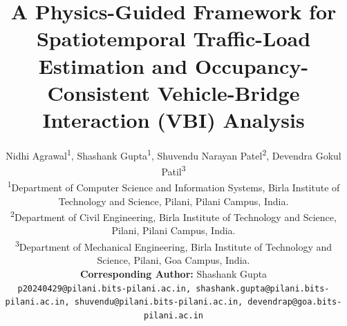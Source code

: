 \documentclass[journal]{IEEEtran}
\begin{document}
    \title{A Physics-Guided Framework for Spatiotemporal Traffic-Load Estimation and Occupancy-Consistent Vehicle-Bridge Interaction (VBI) Analysis}
\author{\footnotesize
    Nidhi Agrawal\textsuperscript{1},
    Shashank Gupta\textsuperscript{1},
    Shuvendu Narayan Patel\textsuperscript{2},
    Devendra Gokul Patil\textsuperscript{3}
    
    {\small
    \textsuperscript{1}Department of Computer Science and Information Systems, Birla Institute of Technology and Science, Pilani, Pilani Campus, India. \\
    \textsuperscript{2}Department of Civil Engineering, Birla Institute of Technology and Science, Pilani, Pilani Campus, India.\\
    \textsuperscript{3}Department of Mechanical Engineering, Birla Institute of Technology and Science, Pilani, Goa Campus, India. \\
    }
    {\scriptsize \textbf{Corresponding Author:} Shashank Gupta} \\[0.ex]
    \scriptsize
    \texttt{p20240429@pilani.bits-pilani.ac.in, shashank.gupta@pilani.bits-pilani.ac.in, shuvendu@pilani.bits-pilani.ac.in, devendrap@goa.bits-pilani.ac.in}
}




\maketitle
\end{document}
